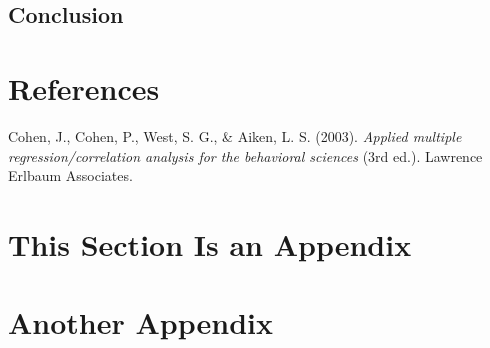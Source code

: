 \documentclass[
  man,
  longtable,
  nolmodern,
  notxfonts,
  notimes,
  colorlinks=true,linkcolor=blue,citecolor=blue,urlcolor=blue]{apa7}
\newlength{\cslhangindent}
\newenvironment{CSLReferences}[2] %
 {\begin{list}{}{%
  \setlength{\itemindent}{0pt}
  \setlength{\leftmargin}{0pt}
  \setlength{\parsep}{0pt}
  \ifodd #1
   \setlength{\leftmargin}{\cslhangindent}
   \setlength{\itemindent}{-1\cslhangindent}
  \fi
  \setlength{\itemsep}{#2\baselineskip}}}
 {\end{list}}
\begin{document}
\subsection{Conclusion}\label{conclusion}

\section{References}\label{references}

\label{refs}
\begin{CSLReferences}{1}{0}
Cohen, J., Cohen, P., West, S. G., \& Aiken, L. S. (2003). \emph{Applied
multiple regression/correlation analysis for the behavioral sciences}
(3rd ed.). Lawrence Erlbaum Associates.

\end{CSLReferences}

\appendix

\section{This Section Is an Appendix}\label{apx-a}

\section{Another Appendix}\label{apx-b}
\end{document}
